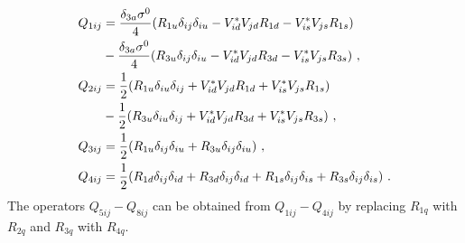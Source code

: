 \begin{align}\label{eq:dependenciesoperators}
	Q_{1ij} &= \frac{\delta_{3a}\sigma^0}{4}(R_{1u}\delta_{ij}\delta_{iu} - V_{id}^*V_{jd}R_{1d} - V_{is}^*V_{js}R_{1s}) \notag \\
	&- \frac{\delta_{3a}\sigma^0}{4} (R_{3u}\delta_{ij}\delta_{iu} - V_{id}^*V_{jd}R_{3d} - V_{is}^*V_{js}R_{3s}) \ , \notag \\
	Q_{2ij} &= \frac{1}{2}(R_{1u}\delta_{iu}\delta_{ij}+ V_{id}^*V_{jd}R_{1d}+ V_{is}^*V_{js}R_{1s}) \notag \\
	&- \frac{1}{2}(R_{3u}\delta_{iu}\delta_{ij} + V_{id}^*V_{jd}R_{3d} + V_{is}^*V_{js}R_{3s}) \ , \notag \\
	Q_{3ij} &= \frac{1}{2}(R_{1u}\delta_{ij}\delta_{iu} + R_{3u}\delta_{ij}\delta_{iu}) \ , \notag \\
	Q_{4ij} &= \frac{1}{2}(R_{1d}\delta_{ij}\delta_{id} + R_{3d}\delta_{ij}\delta_{id} + R_{1s}\delta_{ij}\delta_{is} + R_{3s}\delta_{ij}\delta_{is}) \ .
\end{align}
The operators $Q_{5ij}-Q_{8ij}$ can be obtained from $Q_{1ij}-Q_{4ij}$ by replacing $R_{1q}$ with $R_{2q}$ and $R_{3q}$ with $R_{4q}$.


